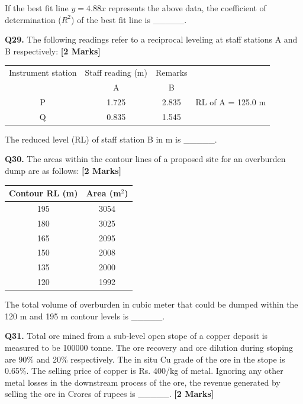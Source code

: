 \documentclass[11pt]{article}
\newcommand{\questionb}[2]{
    \noindent\textbf{Q#2.} #1 \hfill \textbf{[2 Marks]}
}
\begin{document}
If the best fit line \( y = 4.88x \) represents the above data, the coefficient of determination (\( R^2 \)) of the best fit line is \_\_\_\_\_.
\vspace{0.5cm}

\questionb{The following readings refer to a reciprocal leveling at staff stations A and B respectively:}{29}

\begin{center}
\begin{tabular}{|c|c|c|l|}
\hline
Instrument station & Staff reading (m) & Remarks \\
 & A & B & \\
\hline
P & 1.725 & 2.835 & RL of A = 125.0 m \\
Q & 0.835 & 1.545 & \\
\hline
\end{tabular}
\end{center}

The reduced level (RL) of staff station B in m is \_\_\_\_\_.
\vspace{0.5cm}

\questionb{The areas within the contour lines of a proposed site for an overburden dump are as follows:}{30}

\begin{center}
\begin{tabular}{|c|c|}
\hline
Contour RL (m) & Area (m\(^2\)) \\
\hline
195 & 3054 \\
180 & 3025 \\
165 & 2095 \\
150 & 2008 \\
135 & 2000 \\
120 & 1992 \\
\hline
\end{tabular}
\end{center}

The total volume of overburden in cubic meter that could be dumped within the 120 m and 195 m contour levels is \_\_\_\_\_.
\vspace{0.5cm}

\questionb{Total ore mined from a sub-level open stope of a copper deposit is measured to be 100000 tonne. The ore recovery and ore dilution during stoping are 90\% and 20\% respectively. The in situ Cu grade of the ore in the stope is 0.65\%. The selling price of copper is Rs. 400/kg of metal. Ignoring any other metal losses in the downstream process of the ore, the revenue generated by selling the ore in Crores of rupees is \_\_\_\_\_.}{31}
\vspace{0.5cm}
\end{document}
